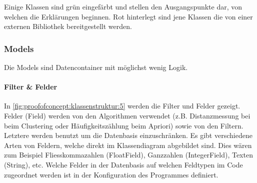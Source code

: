 Einige Klassen sind grün eingefärbt und stellen den Ausgangspunkte dar, von welchen die Erklärungen beginnen. Rot hinterlegt sind jene Klassen die von einer externen Bibliothek bereitgestellt werden.

\subsubsection{Models}
\label{sec:proofofconcept:klassenstruktur:models}
Die Models sind Datencontainer mit möglichst wenig Logik. 

\paragraph{Filter \& Felder} In \cref{fig:proofofconcept:klassenstruktur:5} werden die Filter und Felder gezeigt. Felder (Field) werden von den Algorithmen verwendet (z.B. Distanzmessung bei beim Clustering oder Häufigkeitszählung beim Apriori) sowie von den Filtern. Letztere werden benutzt um die Datenbasis einzuschränken. Es gibt verschiedene Arten von Feldern, welche direkt im Klassendiagram abgebildet sind. Dies wären zum Beispiel Fliesskommazahlen (FloatField), Ganzzahlen (IntegerField), Texten (String), etc. Welche Felder in der Datenbasis auf welchen Feldtypen im Code zugeordnet werden ist in der Konfiguration des Programmes definiert.

